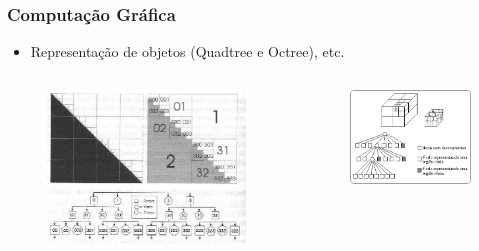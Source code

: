 \documentclass[aspectratio=169]{beamer}
\begin{document}
\begin{frame}\frametitle{Computação Gráfica}
\begin{itemize}
	\item Representação de objetos (Quadtree e Octree), etc.
\end{itemize}
\begin{columns}[T]
\begin{column}{0.36\linewidth}
\begin{figure}[h]
	\centering
	\includegraphics[height=0.45\paperheight]{imagens/quadtree.jpg}
\end{figure}
\end{column}
\begin{column}{0.34\linewidth}
\begin{figure}[h]
	\centering
	\includegraphics[height=0.45\paperheight]{imagens/octree.png}
\end{figure}

\end{column}
\end{columns}
\end{frame}
\end{document}
